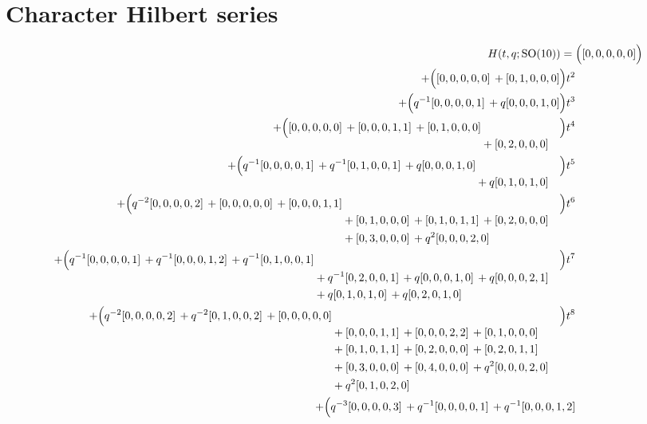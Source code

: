 \documentclass[10pt]{article}
\begin{document}
\section{Character Hilbert series}
\[
\begin{aligned}
H(t,q;\mathrm{SO}(10)) ={}&
   \Bigl([0,0,0,0,0]\Bigr) \\
  + \Bigl([0,0,0,0,0]\,+[0,1,0,0,0]\Bigr)t^{2} \\
  + \Bigl(q^{-1}[0,0,0,0,1]\,+q[0,0,0,1,0]\Bigr)t^{3} \\
  + \Bigl(\begin{aligned}[t][0,0,0,0,0]\,+[0,0,0,1,1]\,+[0,1,0,0,0] \\
  &{}+[0,2,0,0,0]\end{aligned}\Bigr)t^{4} \\
  + \Bigl(\begin{aligned}[t]q^{-1}[0,0,0,0,1]\,+q^{-1}[0,1,0,0,1]\,+q[0,0,0,1,0] \\
  &{}+q[0,1,0,1,0]\end{aligned}\Bigr)t^{5} \\
  + \Bigl(\begin{aligned}[t]q^{-2}[0,0,0,0,2]\,+[0,0,0,0,0]\,+[0,0,0,1,1] \\
  &{}+[0,1,0,0,0]\,+[0,1,0,1,1]\,+[0,2,0,0,0] \\
  &{}+[0,3,0,0,0]\,+q^{2}[0,0,0,2,0]\end{aligned}\Bigr)t^{6} \\
  + \Bigl(\begin{aligned}[t]q^{-1}[0,0,0,0,1]\,+q^{-1}[0,0,0,1,2]\,+q^{-1}[0,1,0,0,1] \\
  &{}+q^{-1}[0,2,0,0,1]\,+q[0,0,0,1,0]\,+q[0,0,0,2,1] \\
  &{}+q[0,1,0,1,0]\,+q[0,2,0,1,0]\end{aligned}\Bigr)t^{7} \\
  + \Bigl(\begin{aligned}[t]q^{-2}[0,0,0,0,2]\,+q^{-2}[0,1,0,0,2]\,+[0,0,0,0,0] \\
  &{}+[0,0,0,1,1]\,+[0,0,0,2,2]\,+[0,1,0,0,0] \\
  &{}+[0,1,0,1,1]\,+[0,2,0,0,0]\,+[0,2,0,1,1] \\
  &{}+[0,3,0,0,0]\,+[0,4,0,0,0]\,+q^{2}[0,0,0,2,0] \\
  &{}+q^{2}[0,1,0,2,0]\end{aligned}\Bigr)t^{8} \\
  + \Bigl(\begin{aligned}[t]q^{-3}[0,0,0,0,3]\,+q^{-1}[0,0,0,0,1]\,+q^{-1}[0,0,0,1,2] \\

\end{aligned}
\end{aligned}\]
\end{document}

